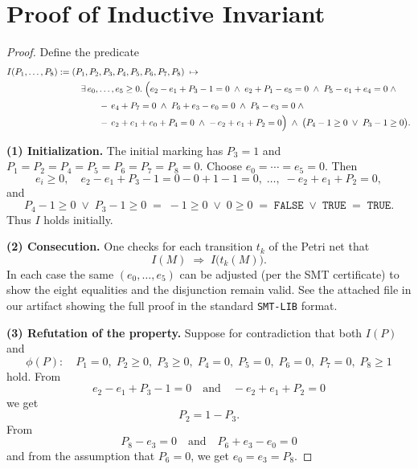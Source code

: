 \appendix

\section{Proof of Inductive Invariant}

\begin{proof}
	
Define the predicate
\[
\begin{aligned}
	I(P_{1},\dots,P_{8})
	:={}&
		(P_{1},\textcolor{black}{P_{2}},\textcolor{black}{P_{3}},P_{4},P_{5},P_{6},\textcolor{black}{P_{7}},\textcolor{black}{P_{8}})
		\;\mapsto\;\\
		&\quad
		\exists\,e_{0},\dots,e_{5}\ge0.\;
		\Bigl(
		e_{2}-e_{1}+\textcolor{black}{P_{3}}-1=0\;\land\;
		e_{2}+P_{1}-e_{5}=0\;\land\;
		P_{5}-e_{1}+e_{4}=0\;\land\\
		&\qquad\quad
		-\,e_{4}+\textcolor{black}{P_{7}}=0\;\land\;
		P_{6}+e_{3}-e_{0}=0\;\land\;
		\textcolor{black}{P_{8}}-e_{3}=0\;\land\\
		&\qquad\quad
		-\,e_{2}+e_{1}+e_{0}+P_{4}=0\;\land\;
		-\,e_{2}+e_{1}+\textcolor{black}{P_{2}}=0
		\Bigr)
		\;\land\;
		\bigl(P_{4}-1\ge0\;\lor\;\textcolor{black}{P_{3}}-1\ge0\bigr).
	\end{aligned}
	\]
	
	
	\medskip\noindent
	\textbf{(1) Initialization.}
	The initial marking has $P_{3}=1$ and $P_{1}=P_{2}=P_{4}=P_{5}=P_{6}=P_{7}=P_{8}=0$.
	Choose $e_{0}=\cdots=e_{5}=0$.  Then
	\[
	e_{i}\ge0,\quad
	e_{2}-e_{1}+P_{3}-1=0-0+1-1=0,\;\dots,\;-e_{2}+e_{1}+P_{2}=0,
	\]
	and 
	\[
	P_{4}-1\ge0\;\lor\;P_{3}-1\ge0
	\;=\;-1\ge0\;\lor\;0\ge0
	\;=\;\texttt{FALSE}\;\lor\;\texttt{TRUE}
	\;=\;\texttt{TRUE}.
	\]
	Thus $I$ holds initially.
	
	\medskip\noindent
	\textbf{(2) Consecution.}
	One checks for each transition $t_{k}$ of the Petri net that
	\[
	I(M)\;\Longrightarrow\;I\bigl(t_{k}(M)\bigr).
	\]
	In each case the same $(e_{0},\dots,e_{5})$ can be adjusted (per the SMT certificate) to show the eight equalities and the disjunction remain valid. See the attached file in our artifact showing the full proof in the standard \texttt{SMT-LIB} format.
	
	\medskip\noindent
	\textbf{(3) Refutation of the property.}
	Suppose for contradiction that both $I(P)$ and
	\[
	\phi(P):\quad
	P_{1}=0,\;
	P_{2}\ge0,\;
	P_{3}\ge0,\;
	P_{4}=0,\;
	P_{5}=0,\;
	P_{6}=0,\;
	P_{7}=0,\;
	P_{8}\ge1
	\]
	hold.  From
	\[
	e_{2}-e_{1}+P_{3}-1=0
	\quad\text{and}\quad
	-e_{2}+e_{1}+P_{2}=0
	\]
	we get
	\[
	P_{2}=1-P_{3}.
	\]
	From
	\[
	P_{8}-e_{3}=0
	\quad\text{and}\quad
	P_{6}+e_{3}-e_{0}=0
	\]
	and from the assumption that $P_6=0$, we get $e_{0}=e_{3}=P_{8}$.
	

\end{proof}

